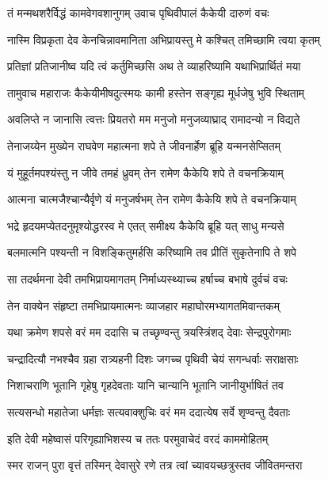 
\twolineshloka
{तं मन्मथशरैर्विद्धं कामवेगवशानुगम्}
{उवाच पृथिवीपालं कैकेयी दारुणं वचः} %

\twolineshloka
{नास्मि विप्रकृता देव केनचिन्नावमानिता}
{अभिप्रायस्तु मे कश्चित् तमिच्छामि त्वया कृतम्} %

\twolineshloka
{प्रतिज्ञां प्रतिजानीष्व यदि त्वं कर्तुमिच्छसि}
{अथ ते व्याहरिष्यामि यथाभिप्रार्थितं मया} %

\twolineshloka
{तामुवाच महाराजः कैकेयीमीषदुत्स्मयः}
{कामी हस्तेन सङ्गृह्य मूर्धजेषु भुवि स्थिताम्} %

\twolineshloka
{अवलिप्ते न जानासि त्वत्तः प्रियतरो मम}
{मनुजो मनुजव्याघ्राद् रामादन्यो न विद्यते} %

\twolineshloka
{तेनाजय्येन मुख्येन राघवेण महात्मना}
{शपे ते जीवनार्हेण ब्रूहि यन्मनसेप्सितम्} %

\twolineshloka
{यं मुहूर्तमपश्यंस्तु न जीवे तमहं ध्रुवम्}
{तेन रामेण कैकेयि शपे ते वचनक्रियाम्} %

\twolineshloka
{आत्मना चात्मजैश्चान्यैर्वृणे यं मनुजर्षभम्}
{तेन रामेण कैकेयि शपे ते वचनक्रियाम्} %

\twolineshloka
{भद्रे हृदयमप्येतदनुमृश्योद्धरस्व मे}
{एतत् समीक्ष्य कैकेयि ब्रूहि यत् साधु मन्यसे} %

\twolineshloka
{बलमात्मनि पश्यन्ती न विशङ्कितुमर्हसि}
{करिष्यामि तव प्रीतिं सुकृतेनापि ते शपे} %

\twolineshloka
{सा तदर्थमना देवी तमभिप्रायमागतम्}
{निर्माध्यस्थ्याच्च हर्षाच्च बभाषे दुर्वचं वचः} %

\twolineshloka
{तेन वाक्येन संहृष्टा तमभिप्रायमात्मनः}
{व्याजहार महाघोरमभ्यागतमिवान्तकम्} %

\twolineshloka
{यथा क्रमेण शपसे वरं मम ददासि च}
{तच्छृण्वन्तु त्रयस्त्रिंशद् देवाः सेन्द्रपुरोगमाः} %

\twolineshloka
{चन्द्रादित्यौ नभश्चैव ग्रहा रात्र्यहनी दिशः}
{जगच्च पृथिवी चेयं सगन्धर्वाः सराक्षसाः} %

\twolineshloka
{निशाचराणि भूतानि गृहेषु गृहदेवताः}
{यानि चान्यानि भूतानि जानीयुर्भाषितं तव} %

\twolineshloka
{सत्यसन्धो महातेजा धर्मज्ञः सत्यवाक्शुचिः}
{वरं मम ददात्येष सर्वे शृण्वन्तु दैवताः} %

\twolineshloka
{इति देवी महेष्वासं परिगृह्याभिशस्य च}
{ततः परमुवाचेदं वरदं काममोहितम्} %

\twolineshloka
{स्मर राजन् पुरा वृत्तं तस्मिन् देवासुरे रणे}
{तत्र त्वां च्यावयच्छत्रुस्तव जीवितमन्तरा} %

